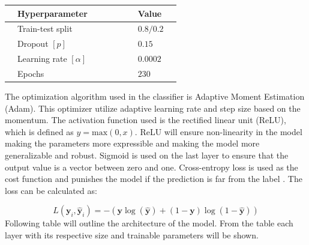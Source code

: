 \documentclass[12pt, fleqn, titlepage]{article}
\newcommand{\1}[1]{\mathds{1}\left[#1\right]}
\begin{document}
	\begin{table}[H]\label{hyperparams}
		\centering
		\begin{tabular}{l l l l l l l l l}
			\toprule
			& \textbf{Hyperparameter}           &&&&& & \textbf{Value}    & \\ \midrule
			& Train-test split         &&&&& & $0.8/0.2$& \\
			& Dropout $[p]$            &&&&& & $0.15$    & \\ 
			& Learning rate $[\alpha]$ &&&&& & $0.0002$  & \\ 
			& Epochs                   &&&&& & $230$    & \\  \bottomrule
		\end{tabular}
	\end{table}
	
	 \noindent
	 The optimization algorithm used in the classifier is Adaptive Moment Estimation (Adam). This optimizer utilize adaptive learning rate and step size based on the momentum. The activation function used is the rectified linear unit (ReLU), which is defined as $ y = \text{max}(0,x) $. ReLU will ensure non-linearity in the model making the parameters more expressible and making the model more generalizable and robust. Sigmoid is used on the last layer to ensure that the output value is a vector between zero and one. Cross-entropy loss is used as the cost function and punishes the model if the prediction is far from the label \cite {dl}. The loss can be calculated as:
	 
	\begin{equation*}\label{key}
		L\left(\boldsymbol{y}_{i}, \hat{\boldsymbol{y}}_{i}\right) = -(\mathbf y \log (\mathbf {\hat y})+(1-\mathbf  y) \log (1-\mathbf {\hat y}))
	\end{equation*}
	\noindent
	Following table will outline the architecture of the model. From the table each layer with its respective size and trainable parameters will be shown.
	
\end{document}
